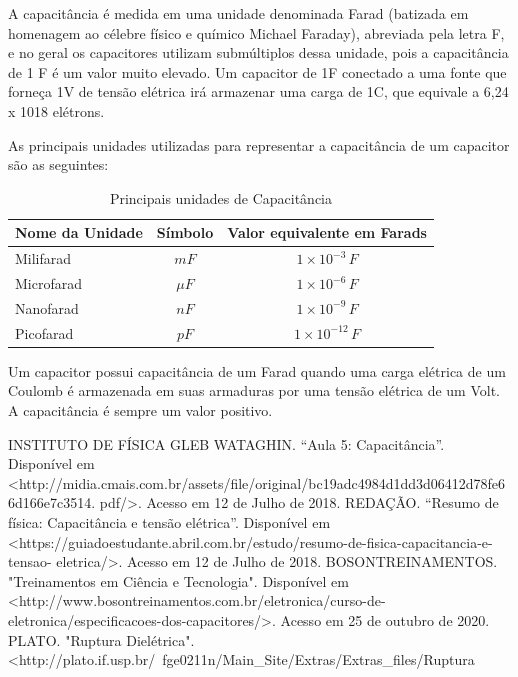 A capacitância é medida em uma unidade denominada Farad (batizada em homenagem ao célebre físico e químico Michael Faraday), abreviada pela letra F, e no geral os capacitores utilizam submúltiplos dessa unidade, pois a capacitância de 1 F é um valor muito elevado. Um capacitor de 1F conectado a uma fonte que forneça 1V de tensão elétrica irá armazenar uma carga de 1C, que equivale a 6,24 x 1018 elétrons.

As principais unidades utilizadas para representar a capacitância de um capacitor são as seguintes:

	\begin{table}[H]
		\centering
	\begin{tabular}{l|c|c}
		\hline 
		Nome da Unidade & Símbolo & Valor equivalente em Farads\\ 
		\hline 
		Milifarad & $m F$ & $1 \times 10^{-3}\,F$ \\ 
		Microfarad & $\mu F$ & $1 \times 10^{-6}\,F$ \\  
		Nanofarad & $n F$ & $1 \times 10^{-9}\,F$ \\  
		Picofarad & $p F$ & $1 \times 10^{-12}\,F$ \\ 
		\hline 
	\end{tabular} 
		\caption{Principais unidades de Capacitância}
		\label{tab:capacitancias}
	\end{table}

Um capacitor possui capacitância de um Farad quando uma carga elétrica de um Coulomb é armazenada em suas armaduras por uma tensão elétrica de um Volt. A capacitância é sempre um valor positivo.


  \begin{thebibliography}{1}
     INSTITUTO DE FÍSICA GLEB WATAGHIN. “Aula 5: Capacitância”. Disponível em
<http://midia.cmais.com.br/assets/file/original/bc19adc4984d1dd3d06412d78fe66d166e7c3514.
pdf/>. Acesso em 12 de Julho de 2018.
     REDAÇÃO. “Resumo de física: Capacitância e tensão elétrica”. Disponível em
<https://guiadoestudante.abril.com.br/estudo/resumo-de-fisica-capacitancia-e-tensao-
eletrica/>. Acesso em 12 de Julho de 2018.
     BOSONTREINAMENTOS. "Treinamentos em Ciência e Tecnologia". Disponível em <http://www.bosontreinamentos.com.br/eletronica/curso-de-eletronica/especificacoes-dos-capacitores/>. Acesso em 25 de outubro de 2020.
     PLATO. "Ruptura Dielétrica". <http://plato.if.usp.br/~fge0211n/Main_Site/Extras/Extras_files/Ruptura%
  \end{thebibliography}